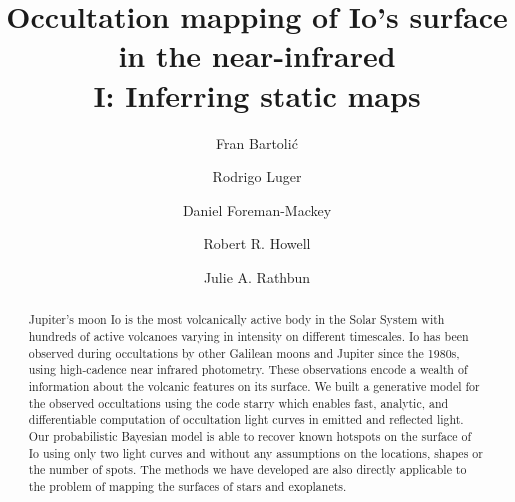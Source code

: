\documentclass[modern]{aastex62}
\begin{document}
\title{
    \vspace{-3em}
\textbf{Occultation mapping of Io's surface in the near-infrared \\ I: Inferring static maps} 
}
\author[0000-0001-8630-9794]{Fran Bartoli\'c}
\author[0000-0002-0296-3826]{Rodrigo Luger}
\author[0000-0002-9328-5652]{Daniel Foreman-Mackey}
\author[0000-0003-4859-2060]{Robert R. Howell}
\author[0000-0001-7619-652X]{Julie A. Rathbun}
%

\begin{abstract}
Jupiter's moon Io is the most volcanically active body in the Solar System with hundreds of active volcanoes varying in intensity on different timescales.
Io has been observed during occultations by other Galilean moons and Jupiter since the 1980s, using high-cadence near infrared photometry. 
These observations encode a wealth of information about the volcanic features on its surface.
    We built a generative model for the observed occultations using the code \textsf{starry} which enables fast, analytic, and differentiable computation of occultation light curves in emitted and reflected light.
    Our probabilistic Bayesian model is able to recover known hotspots on the surface of Io using only two light curves and without any assumptions on the locations, shapes or the number of spots.
    The methods we have developed are also directly applicable to the problem of mapping the surfaces of stars and exoplanets. \href{https://github.com/fbartolic/volcano}{\color{linkcolor}\faGithub}
\end{abstract}

%
\end{document}
